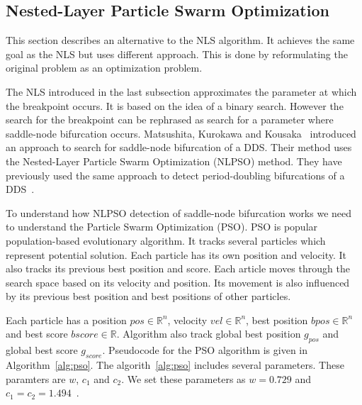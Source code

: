 \subsection{Nested-Layer Particle Swarm Optimization}
This section describes an alternative to the NLS algorithm.
It achieves the same goal as the NLS but uses different approach.
This is done by reformulating the original problem as an optimization problem.
\par
The NLS introduced in the last subsection approximates the parameter at which the breakpoint occurs.
It is based on the idea of a binary search.
However the search for the breakpoint can be rephrased as search for a parameter where saddle-node bifurcation occurs.
Matsushita, Kurokawa and Kousaka~\cite{Matsushita2019} introduced an approach to search for saddle-node bifurcation of a DDS.
Their method uses the Nested-Layer Particle Swarm Optimization (NLPSO) method.
They have previously used the same approach to detect period-doubling bifurcations of a DDS~\cite{Matsushita20170721}.
\par
To understand how NLPSO detection of saddle-node bifurcation works we need to understand the Particle Swarm Optimization (PSO).
PSO is popular population-based evolutionary algorithm.
It tracks several particles which represent potential solution.
Each particle has its own position and velocity. It also tracks its previous best position and score.
Each article moves through the search space based on its velocity and position.
Its movement is also influenced by its previous best position and best positions of other particles.~\cite{Matsushita2019}
\par
Each particle has a position $pos \in \mathbb{R}^{n}$, velocity $vel \in \mathbb{R}^{n}$, best position $bpos \in \mathbb{R}^{n}$ and best score $bscore \in \mathbb{R}$.
Algorithm also track global best position $g_{pos}$ and global best score $g_{score}$.
Pseudocode for the PSO algorithm is given in Algorithm~\ref{alg:pso}.
The algorith~\ref{alg:pso} includes several parameters.
These paramters are $w$, $c_{1}$ and $c_{2}$.
We set these parameters as $w=0.729$ and $c_{1}=c_{2}=1.494$~\cite{Matsushita2019}.

